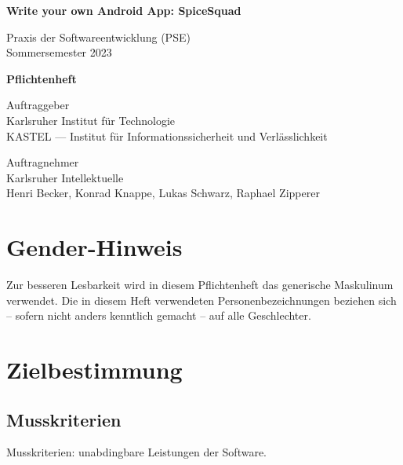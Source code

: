 \documentclass[parskip=full]{scrartcl}
\begin{document}
\begin{titlepage}
    \begin{center}
        \begin{Huge}
            {\textbf{Write your own Android App: SpiceSquad}}
        \end{Huge}
        \vspace{12px}

        Praxis der Softwareentwicklung (PSE)\\
        Sommersemester 2023\\
        \vspace{150px}

        \begin{Huge}
            {\textbf{Pflichtenheft}}
        \end{Huge}
        \vspace{12px}

        Auftraggeber\\
        Karlsruher Institut für Technologie\\
        KASTEL — Institut für Informationssicherheit und Verlässlichkeit\\
        \vspace{330px}

        Auftragnehmer\\
        Karlsruher Intellektuelle\\
        Henri Becker, Konrad Knappe, Lukas Schwarz, Raphael Zipperer\\
    \end{center}
\end{titlepage}

\tableofcontents

\vspace{32px}
\section*{Gender-Hinweis}
Zur besseren Lesbarkeit wird in diesem Pflichtenheft das generische Maskulinum verwendet.
Die in diesem Heft verwendeten Personenbezeichnungen beziehen sich – sofern nicht anders kenntlich gemacht – auf alle Geschlechter.
\newpage

\section{Zielbestimmung}

\subsection{Musskriterien}
Musskriterien: unabdingbare Leistungen der Software.
\end{document}
